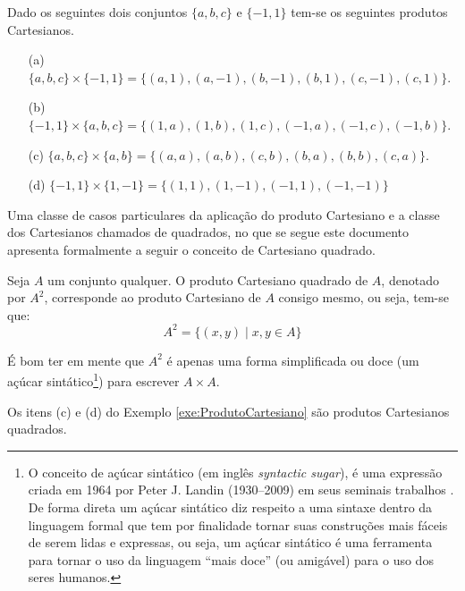 \begin{exemplo}\label{exe:ProdutoCartesiano}
    Dado os seguintes dois conjuntos $\{a, b, c\}$ e $\{-1, 1\}$ tem-se os seguintes produtos Cartesianos.
    \begin{itemize}
        \item[(a)] $\{a, b, c\} \times \{-1, 1\} = \{(a, 1), (a, -1), (b, -1), (b, 1), (c, -1), (c, 1)\}$.
        \item[(b)] $\{-1, 1\} \times \{a, b, c\} = \{(1, a), (1, b), (1, c), (-1, a), (-1, c), (-1, b)\}$.
        \item[(c)] $\{a, b, c\} \times \{a, b\} = \{(a, a), (a, b), (c, b), (b, a), (b, b), (c, a)\}$.
        \item[(d)] $\{-1, 1\} \times \{1, -1\} = \{(1, 1), (1, -1), (-1, 1), (-1, -1)\}$ 
    \end{itemize}
\end{exemplo}

Uma classe de casos particulares da aplicação do produto Cartesiano e a classe dos Cartesianos chamados de quadrados, no que se segue este documento apresenta formalmente a seguir o conceito de Cartesiano quadrado.

\begin{definicao}\label{def:CartesianoQuadrado}
    Seja $A$ um conjunto qualquer. O produto Cartesiano quadrado de $A$, denotado por $A^2$, corresponde ao produto Cartesiano de $A$ consigo mesmo, ou seja, tem-se que:
    \begin{equation*}
        A^2 = \{(x, y) \mid x,y \in A\}
    \end{equation*}
\end{definicao}

\begin{nota}
    É bom ter em mente que $A^2$ é apenas uma forma simplificada ou doce (um açúcar sintático\footnote{O conceito de açúcar sintático (em inglês \textit{syntactic sugar}), é uma expressão criada em 1964 por Peter J. Landin (1930--2009) em seus seminais trabalhos \cite{landin1964,landin1965-1,landin1965-2}. De forma direta um açúcar sintático diz respeito a uma sintaxe dentro da linguagem formal que tem por finalidade tornar suas construções mais fáceis de serem lidas e expressas, ou seja, um açúcar sintático é uma ferramenta para tornar o uso da linguagem “mais doce” (ou amigável) para o uso dos seres humanos.}) para escrever $A \times A$.
\end{nota}

\begin{exemplo}\label{exe:CartesianoQuadrado}
    Os itens (c) e (d) do Exemplo \ref{exe:ProdutoCartesiano} são produtos Cartesianos quadrados.
\end{exemplo}

